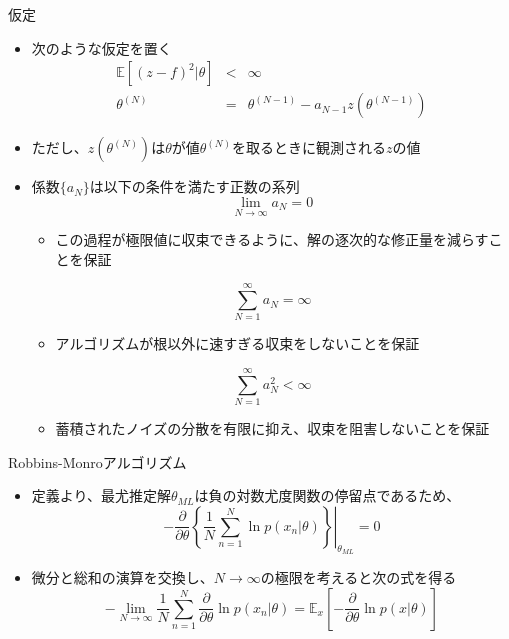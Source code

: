 \begin{frame}{仮定}
 \begin{itemize}
  \item 次のような仮定を置く
        \begin{eqnarray}
         \mathbb{E}[(z-f)^2|\theta] &<& \infty\\
         \theta^{(N)}&=& \theta^{(N-1)}-a_{N-1}z(\theta^{(N-1)})
        \end{eqnarray}
  \item ただし、$z(\theta^{(N)})$は$\theta$が値$\theta^{(N)}$を取るときに観測される$z$の値
  \item 係数$\{a_N\}$は以下の条件を満たす正数の系列
        \begin{equation}
         \lim_{N \rightarrow \infty}a_N=0
        \end{equation}
        \begin{itemize}
         \item この過程が極限値に収束できるように、解の逐次的な修正量を減らすことを保証
        \end{itemize}
        \begin{equation}
         \sum_{N=1}^{\infty}a_N=\infty
        \end{equation}
        \begin{itemize}
         \item アルゴリズムが根以外に速すぎる収束をしないことを保証
        \end{itemize}
        \begin{equation}
         \sum_{N=1}^{\infty}a_N^2 < \infty
        \end{equation}
        \begin{itemize}
         \item 蓄積されたノイズの分散を有限に抑え、収束を阻害しないことを保証
        \end{itemize}
 \end{itemize}
\end{frame}

\begin{frame}{Robbins-Monroアルゴリズム}
 \begin{itemize}
  \item 定義より、最尤推定解$\theta_{ML}$は負の対数尤度関数の停留点であるため、
        \begin{equation}
         -\frac{\partial }{\partial \theta}\left\{\left.\frac{1}{N}\sum_{n=1}^{N}\ln  p(x_n|\theta)\right\}\right|_{\theta_{ML}} = 0
        \end{equation}
  \item 微分と総和の演算を交換し、$N\rightarrow\infty$の極限を考えると次の式を得る
        \begin{equation}
         -\lim_{N \rightarrow \infty}\frac{1}{N}\sum_{n=1}^{N}\frac{\partial}{\partial \theta}\ln p(x_n|\theta)=\mathbb{E}_x\left[-\frac{\partial}{\partial \theta}\ln p(x|\theta)\right]
        \end{equation}
 \end{itemize}
\end{frame}

